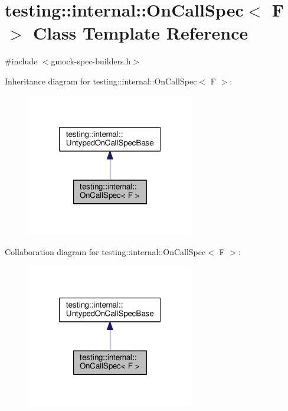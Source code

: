 \hypertarget{classtesting_1_1internal_1_1OnCallSpec}{}\section{testing\+:\+:internal\+:\+:On\+Call\+Spec$<$ F $>$ Class Template Reference}
\label{classtesting_1_1internal_1_1OnCallSpec}


{\ttfamily \#include $<$gmock-\/spec-\/builders.\+h$>$}



Inheritance diagram for testing\+:\+:internal\+:\+:On\+Call\+Spec$<$ F $>$\+:
\nopagebreak
\begin{figure}[H]
\begin{center}
\leavevmode
\includegraphics[width=208pt]{classtesting_1_1internal_1_1OnCallSpec__inherit__graph}
\end{center}
\end{figure}


Collaboration diagram for testing\+:\+:internal\+:\+:On\+Call\+Spec$<$ F $>$\+:
\nopagebreak
\begin{figure}[H]
\begin{center}
\leavevmode
\includegraphics[width=208pt]{classtesting_1_1internal_1_1OnCallSpec__coll__graph}
\end{center}
\end{figure}

